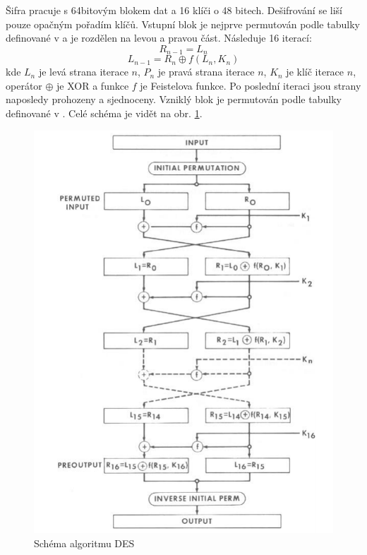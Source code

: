 \documentclass[12pt, a4paper]{article}
\begin{document}
Šifra pracuje s 64bitovým blokem dat a 16 klíči o 48 bitech.
Dešifrování se liší pouze opačným pořadím klíčů.
Vstupní blok je nejprve permutován podle tabulky definované v \cite{fips46} a je rozdělen na levou a pravou část.
Následuje 16 iterací:
\[ R_{n-1} = L_n \]
\[ L_{n-1} = R_n \mathbin{\oplus} f(L_n, K_n) \]
kde $L_n$ je levá strana iterace $n$, $P_n$ je pravá strana iterace $n$, $K_n$ je klíč iterace $n$, operátor $\mathbin{\oplus}$ je XOR a funkce $f$ je Feistelova funkce.
Po poslední iteraci jsou strany naposledy prohozeny a sjednoceny.
Vzniklý blok je permutován podle tabulky definované v \cite{fips46}.
Celé schéma je vidět na obr. \ref{fig:img-des}.
\begin{figure}
	\centering
	\includegraphics[width=1\linewidth]{img-des}
	\caption{Schéma algoritmu DES \cite{fips46}}
	\label{fig:img-des}
\end{figure}
\end{document}

